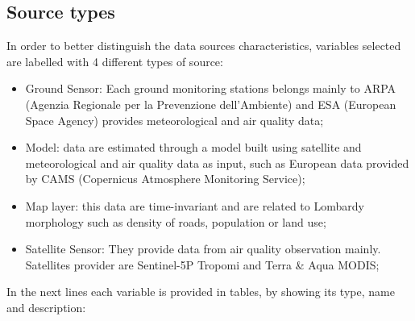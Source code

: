 \subsection{Source types}
In order to better distinguish the data sources characteristics, variables selected are labelled with 4 different types of source:
\begin{itemize}

\item Ground Sensor: Each ground monitoring stations belongs mainly to ARPA (Agenzia Regionale per la Prevenzione dell'Ambiente) and ESA (European Space Agency) provides meteorological and air quality data;
\item Model: data are estimated through a model built using satellite and meteorological and air quality data as input, such as European data provided by CAMS (Copernicus Atmosphere Monitoring Service);
\item Map layer: this data are time-invariant and are related to Lombardy morphology such as density of roads, population or land use; 
\item Satellite Sensor: They provide data from air quality observation mainly. Satellites provider are Sentinel-5P Tropomi and Terra \& Aqua MODIS;
\end{itemize}
\bigbreak

In the next lines each variable is provided in tables, by showing its type, name and description:

